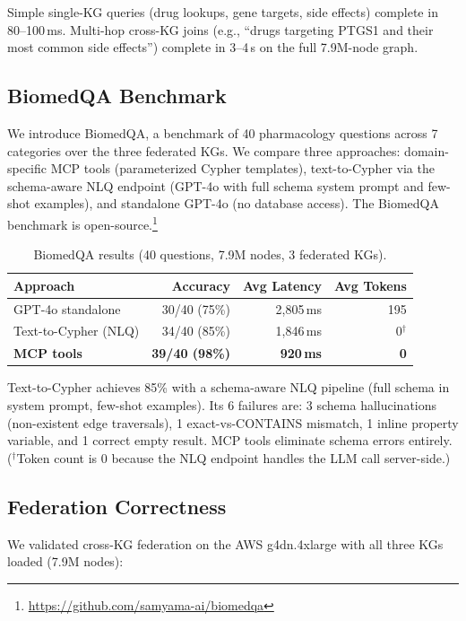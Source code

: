 \documentclass[11pt]{article}
\begin{document}
Simple single-KG queries (drug lookups, gene targets, side effects) complete in 80--100\,ms. Multi-hop cross-KG joins (e.g., ``drugs targeting PTGS1 and their most common side effects'') complete in 3--4\,s on the full 7.9M-node graph.

\subsection{BiomedQA Benchmark}

We introduce BiomedQA, a benchmark of 40 pharmacology questions across 7 categories over the three federated KGs. We compare three approaches: domain-specific MCP tools (parameterized Cypher templates), text-to-Cypher via the schema-aware NLQ endpoint (GPT-4o with full schema system prompt and few-shot examples), and standalone GPT-4o (no database access). The BiomedQA benchmark is open-source.\footnote{\url{https://github.com/samyama-ai/biomedqa}}

\begin{table}[H]
\centering
\caption{BiomedQA results (40 questions, 7.9M nodes, 3 federated KGs).}
\label{tab:biomedqa}
\small
\begin{tabular}{lrrr}
\toprule
\textbf{Approach} & \textbf{Accuracy} & \textbf{Avg Latency} & \textbf{Avg Tokens} \\
\midrule
GPT-4o standalone & 30/40 (75\%) & 2,805\,ms & 195 \\
Text-to-Cypher (NLQ) & 34/40 (85\%) & 1,846\,ms & 0$^{\dagger}$ \\
\textbf{MCP tools} & \textbf{39/40 (98\%)} & \textbf{920\,ms} & \textbf{0} \\
\bottomrule
\end{tabular}
\end{table}

Text-to-Cypher achieves 85\% with a schema-aware NLQ pipeline (full schema in system prompt, few-shot examples). Its 6 failures are: 3 schema hallucinations (non-existent edge traversals), 1 exact-vs-CONTAINS mismatch, 1 inline property variable, and 1 correct empty result. MCP tools eliminate schema errors entirely. ($^{\dagger}$Token count is 0 because the NLQ endpoint handles the LLM call server-side.)

\subsection{Federation Correctness}

We validated cross-KG federation on the AWS g4dn.4xlarge with all three KGs loaded (7.9M nodes):
\end{document}

